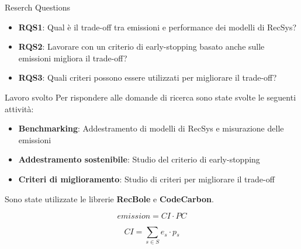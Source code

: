 \begin{frame}{Reserch Questions}
    \begin{itemize}
        \item \textbf{RQS1}: Qual è il trade-off tra emissioni e performance dei modelli di RecSys?
        \item \textbf{RQS2}: Lavorare con un criterio di early-stopping basato anche sulle emissioni migliora il trade-off?
        \item \textbf{RQS3}: Quali criteri possono essere utilizzati per migliorare il trade-off?
    \end{itemize}
\end{frame}

\begin{frame}{Lavoro svolto}
    Per rispondere alle domande di ricerca sono state svolte le seguenti attività:
    \begin{itemize}
        \item \textbf{Benchmarking}: Addestramento di modelli di RecSys e misurazione delle emissioni
        \item \textbf{Addestramento sostenibile}: Studio del criterio di early-stopping
        \item \textbf{Criteri di miglioramento}: Studio di criteri per migliorare il trade-off
    \end{itemize}
    Sono state utilizzate le librerie \textbf{RecBole} e \textbf{CodeCarbon}.

    \begin{equation*}
        \textit{emission} = \textit{CI}  \cdot \textit{PC}
    \end{equation*}
    
    \begin{equation*}
        \textit{CI} = \sum_{s \in S} \textit{e$_s$} \cdot \textit{p$_s$}
    \end{equation*}
    
\end{frame}